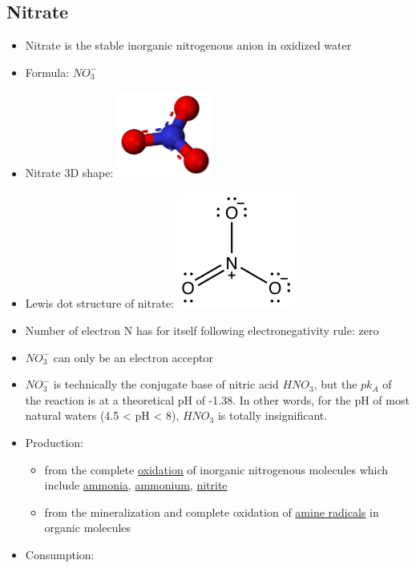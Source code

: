 \documentclass[]{book}
\providecommand{\tightlist}{%
  \setlength{\itemsep}{0pt}\setlength{\parskip}{0pt}}
\theoremstyle{definition}
\theoremstyle{definition}
\theoremstyle{definition}
\theoremstyle{remark}
\begin{document}
\subsection{Nitrate}\label{nitrate}

\begin{itemize}
\item
  Nitrate is the stable inorganic nitrogenous anion in oxidized water
\item
  Formula: \(NO_3^{-}\)
\item
  Nitrate 3D shape:
  \includegraphics[width=0.25000\textwidth]{pictures/Nitrate-3D-balls.png}
\item
  Lewis dot structure of nitrate:
  \includegraphics{pictures/nitrate_lewis_structure.png}
\item
  Number of electron N has for itself following electronegativity rule:
  zero
\item
  \(NO_3^{-}\) can only be an electron acceptor
\item
  \(NO_3^{-}\) is technically the conjugate base of nitric acid
  \(HNO_3\), but the \(pk_A\) of the reaction is at a theoretical pH of
  -1.38. In other words, for the pH of most natural waters (4.5
  \textless{} pH \textless{} 8), \(HNO_3\) is totally insignificant.
\item
  Production:

  \begin{itemize}
  \tightlist
  \item
    from the complete \protect\hyperlink{oxidation}{oxidation} of
    inorganic nitrogenous molecules which include
    \protect\hyperlink{NH3}{ammonia}, \protect\hyperlink{NH4}{ammonium},
    \protect\hyperlink{NO2}{nitrite}
  \item
    from the mineralization and complete oxidation of
    \protect\hyperlink{amine}{amine radicals} in organic molecules
  \end{itemize}
\item
  Consumption:


\end{itemize}
\end{document}
